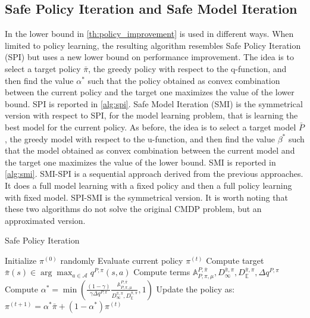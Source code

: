 \subsection{Safe Policy Iteration and Safe Model Iteration}
In \citep{cmdp} the lower bound in \cref{th:policy_improvement} is used in different ways. When limited to policy learning, the resulting algorithm resembles  Safe Policy Iteration (SPI) \citep{pmlr-v28-pirotta13} but uses a new lower bound on performance improvement.
The idea is to select a target policy $\bar{\pi}$, the greedy policy with respect to the q-function, and then find the value $\alpha^*$ such that the policy obtained as convex combination between the current policy and the target one maximizes the value of the lower bound.
SPI is reported in \cref{alg:spi}. \newline
Safe Model Iteration (SMI) is the symmetrical version with respect to SPI, for the model learning problem, that is learning the best model for the current policy. As before, the idea is to select a target model $\bar{P}$, the greedy model with respect to the u-function, and then find the value $\beta^*$ such that the model obtained as convex combination between the current model and the target one maximizes the value of the lower bound.
SMI is reported in \cref{alg:smi}. \newline
SMI-SPI is a sequential approach derived from the previous approaches. It does a full model learning with a fixed policy and then a full policy learning with fixed model. \newline
SPI-SMI is the symmetrical version. It is worth noting that these two algorithms do not solve the original CMDP problem, but an approximated version.

\begin{algorithm}[tb]
  \caption{Safe Policy Iteration
    \label{alg:spi}}
  \begin{algorithmic}[1]
  \State Initialize $\pi^{(0)}$ randomly
  \State Evaluate current policy $\pi^{(t)}$
  \State Compute target $\bar{\pi}(s) \in \arg \max_{a \in \mathcal{A}} q^{P,\pi}(s,a)$
  \State Compute terms $\mathds{A}_{P, \pi, \mu}^{P,\bar{\pi}}, D_\infty^{\bar{\pi},\pi}, D_{\mathbb{E}}^{\bar{\pi}, \pi}, \Delta q^{P,\pi}$
  \State Compute $\alpha^* = \min \left( \frac{(1-\gamma)}{\gamma \Delta q^{P,\pi}} \frac{\mathds{A}_{P, \pi, \mu}^{P,\bar{\pi}}}{D_\infty^{\bar{\pi},\pi}, D_{\mathbb{E}}^{\bar{\pi}, \pi}}, 1 \right)$ 
   \State Update the policy as: $\pi^{(t+1)} = \alpha^* \bar{\pi} + \left( 1 - \alpha^* \right) \pi^{(t)}$ 
  \EndFor \\
  \end{algorithmic}
\end{algorithm}

